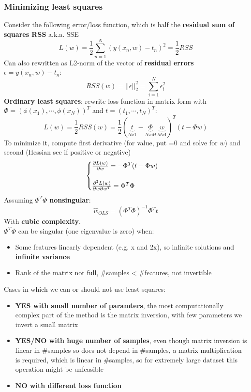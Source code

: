 \subsubsection{Minimizing least squares}
    Consider the following error/loss function, which is half the \textbf{residual sum of squares RSS} a.k.a. SSE
    $$L(w)=\frac{1}{2}\sum_{n=1}^N(y(x_n,w)-t_n)^2=\frac{1}{2}RSS$$
    Can also rewritten as L2-norm of the vector of \textbf{residual errors} $\epsilon=y(x_n,w)-t_n$:
    $$RSS(w)=||\epsilon||_2^2=\sum_{i=1}^N\epsilon_i^2$$
    \textbf{Ordinary least squares}: rewrite loss function in matrix form with $\Phi=(\phi(x_1),\cdots,\phi(x_N))^T$ and $t=(t_1,\cdots,t_N)^T$:
    $$L(w)=\frac{1}{2}RSS(w)=\frac{1}{2}(\underset{Nx1}{\underbrace{t}}-\underset{NxM}{\underbrace{\Phi}}\,\underset{Mx1}{\underbrace{w}})^T(t-\Phi w)$$
    To minimize it, compute first derivative (for value, put =0 and solve for $w$) and second (Hessian see if positive or negative)
    $$
    \begin{cases}
        \frac{\partial L(w)}{\partial w}=-\Phi^T(t-\Phi w)\\
        \vspace{0em}\\
        \frac{\partial^2L(w)}{\partial w \partial w^T}=\Phi^T\Phi
    \end{cases}
    $$
    Assuming $\Phi^T\Phi$ \textbf{nonsingular}:
    $$\hat{w}_{OLS}=(\Phi^T\Phi)^{-1}\Phi^Tt$$
    With \textbf{cubic complexity}.\\
    $\Phi^T\Phi$ can be singular (one eigenvalue is zero) when:
    \begin{itemize}
        \item Some features linearly dependent (e.g. x and 2x), so infinite solutions and \textbf{infinite variance}
        \item Rank of the matrix not full, \#samples < \#features, not invertible
    \end{itemize}
    Cases in which we can or should not use least squares:
    \begin{itemize}
        \item \textbf{YES with small number of paramters}, the most computationally complex part of the method is the matrix inversion, with few parameters we invert a small matrix
        \item \textbf{YES/NO with huge number of samples}, even though matrix inversion is linear in \#samples so does not depend in \#samples, a matrix multiplication is required, which is linear in \#samples, so for extremely large dataset this operation might be unfeasible
        \item \textbf{NO with different loss function}
    \end{itemize}
